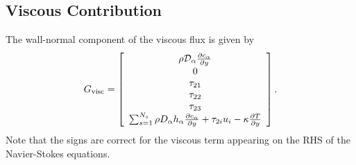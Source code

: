 %


\subsection{Viscous Contribution}
\label{sec:viscous_implicit_operator}
The wall-normal component of the viscous flux is given by
%
\begin{equation*}
G_{\mathrm{visc}} = \left[ \begin{array}{c}
\rho \mathcal{D}_{\alpha} \frac{\partial c_{\alpha}}{\partial y} \\
0 \\
\tau_{21} \\
\tau_{22} \\
\tau_{23} \\
\sum_{s=1}^{N_s} \rho D_{\alpha} h_{\alpha} \frac{\partial c_{\alpha}}{\partial y} + \tau_{2i} u_i - \kappa \frac{\partial T}{\partial y}
\end{array} \right].
\end{equation*}
% 
Note that the signs are correct for the viscous term appearing on the
RHS of the Navier-Stokes equations.

